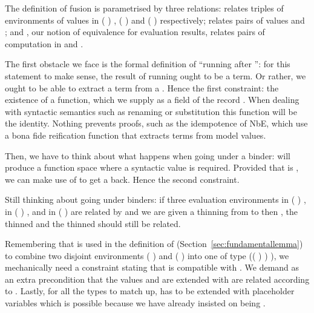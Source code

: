 The definition of fusion is parametrised by three relations:  relates
triples of environments of values in {( )  },
{( )  } and {( )  }
respectively;  relates pairs of values  and ;
and , our notion of equivalence for evaluation results, relates pairs
of computation in  and .

\begin{agdasnippet}
\end{agdasnippet}
The first obstacle we face is the formal definition of ``running 
after '': for this statement to make sense, the result of running
 ought to be a term. Or rather, we ought to be able to extract a
term from a . Hence the first constraint: the existence of a 
function, which we supply as a field of the record . When dealing with
syntactic semantics such as renaming or substitution
this function will be the identity. Nothing prevents proofs, such as the
idempotence of NbE, which use a bona fide reification function that extracts
terms from model values.

\begin{agdasnippet}
\addtolength{\leftskip}{\parindent}
\end{agdasnippet}
Then, we have to think about what happens when going under a binder: 
will produce a  function space where a syntactic
value is required. Provided that  is , we can make use of 
to get a  back. Hence the second constraint.

\begin{agdasnippet}
\addtolength{\leftskip}{\parindent}
\end{agdasnippet}
Still thinking about going under binders: if three evaluation environments
 in {( )  },  in
{( )  }, and  in {( )  }
are related by  and we are given a thinning  from  to 
then , the thinned  and the thinned  should still be related.

\begin{agdasnippet}
\addtolength{\leftskip}{\parindent}
\end{agdasnippet}
Remembering that \AF{\_>>\_} is used in the definition of  (Section~\ref{sec:fundamentallemma}) to
combine two disjoint environments {( )  } and
{( )  } into one of type
{(( \AF{++} ) )  )}, we mechanically need a
constraint stating that \AF{\_>>\_} is compatible with . We demand
as an extra precondition that the values  and  are extended
with are related according to . Lastly, for all the types to match up,
 has to be extended with placeholder variables which is possible because
we have already insisted on  being .

